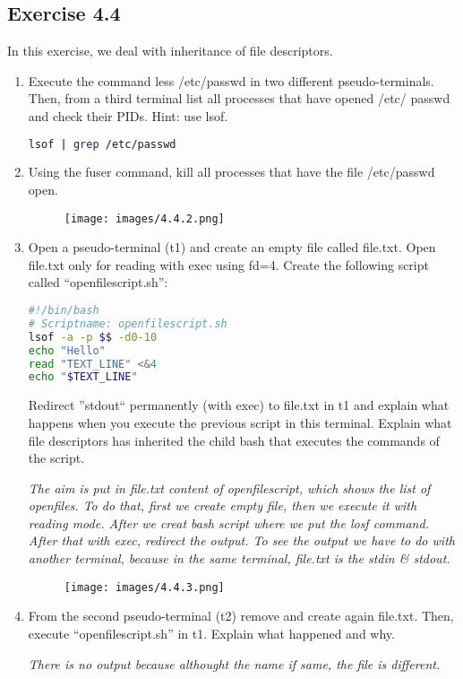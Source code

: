 \documentclass[12pt, titlepage,]{article}
\begin{document}
\subsection{Exercise 4.4}
In this exercise, we deal with inheritance of file descriptors. 
\begin{enumerate}
    \item Execute the command less /etc/passwd in two different pseudo-terminals. Then, from a third terminal list all processes that have opened /etc/ passwd and check their PIDs. Hint: use lsof. 
    \begin{lstlisting}[language=Bash]
    lsof | grep /etc/passwd
    \end{lstlisting}
    
    \item Using the fuser command, kill all processes that have the file /etc/passwd open.
    \begin{figure}[h] %
    \centering
    {\texttt{[image: images/4.4.2.png]}}
    \end{figure} 


\item  Open a pseudo-terminal (t1) and create an empty file called file.txt. Open file.txt only for reading with exec using fd=4. Create the following script called “openfilescript.sh”: 
    \begin{lstlisting}[language=Bash]
#!/bin/bash
# Scriptname: openfilescript.sh
lsof -a -p $$ -d0-10   
echo "Hello"
read "TEXT_LINE" <&4
echo "$TEXT_LINE"
    \end{lstlisting}
    Redirect ”stdout“ permanently (with exec) to file.txt in t1 and explain what happens when you execute the previous script in this terminal. Explain what file descriptors has inherited the child bash that executes the commands of the script.

    \textit{\color{blue} The aim is put in file.txt content of openfilescript, which shows the list of openfiles. To do that, first we create empty file, then we execute it with reading mode. After we creat bash script where we put the losf command. After that with exec, redirect the output. To see the output we have to do with another terminal, because in the same terminal, file.txt is the stdin \& stdout.}

    \begin{figure}[htbp] %
    \centering
    {\texttt{[image: images/4.4.3.png]}}
    \end{figure} 

\vspace{50mm}
    \item  From the second pseudo-terminal (t2) remove and create again file.txt. Then, execute “openfilescript.sh” in t1. Explain what happened and why.
    
       \textit{\color{blue}There is no output because althought the name if same, the file is different.}
    
\end{enumerate}
\clearpage
\end{document}
